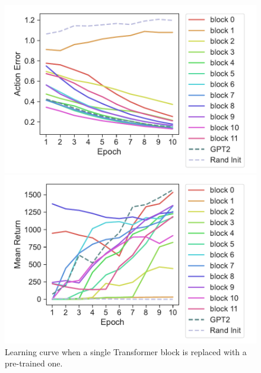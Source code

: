 \begin{figure}[H]
    \centering
    \begin{minipage}[b]{0.4\linewidth}
        \includegraphics[width=\linewidth]{figs/actionerror_block_gpt2_dt_K1_hopper_medium_666.pdf}
    \end{minipage}
    \begin{minipage}[b]{0.4\linewidth}
        \includegraphics[width=\linewidth]{figs/returnmean_block_gpt2_dt_K1_hopper_medium_666.pdf}
    \end{minipage}
    \caption{Learning curve when a single Transformer block is replaced with a pre-trained one.}
    \label{fig:learning_curve}
\end{figure}

